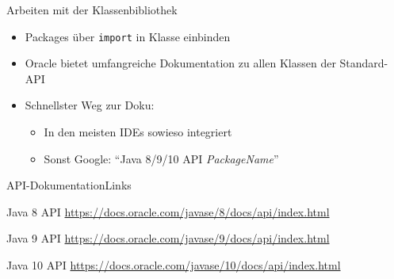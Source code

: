 \begin{frame}{Arbeiten mit der Klassenbibliothek}
	\begin{itemize}
		\item Packages über \texttt{import} in Klasse einbinden
		\item Oracle bietet umfangreiche Dokumentation zu allen Klassen der Standard-API
		\item Schnellster Weg zur Doku:
		\begin{itemize}
			\item In den meisten IDEs sowieso integriert
			\item Sonst Google: "`Java 8/9/10 API \textit{PackageName}"'
		\end{itemize}
	\end{itemize}
\end{frame}

\begin{frame}{API-Dokumentation}{Links}
	\vfill
	\begin{block}{Java 8 API}
		\url{https://docs.oracle.com/javase/8/docs/api/index.html}
	\end{block}
	
	\begin{block}{Java 9 API}
		\url{https://docs.oracle.com/javase/9/docs/api/index.html}
	\end{block}
	
	\begin{block}{Java 10 API}
		\url{https://docs.oracle.com/javase/10/docs/api/index.html}
	\end{block}
	\vfill
\end{frame}